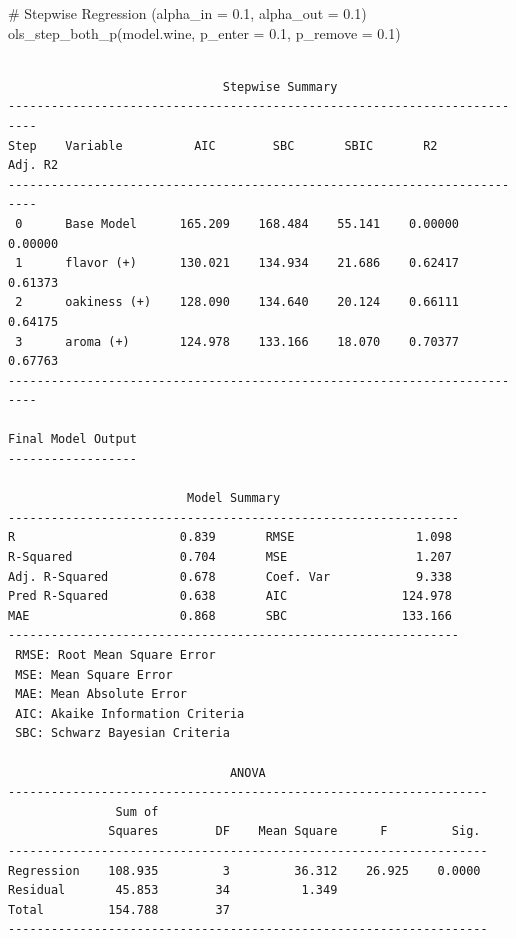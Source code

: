 \documentclass[
  letterpaper,
]{scrbook}
\newenvironment{Shaded}{\begin{snugshade}}{\end{snugshade}}
\newcommand{\AttributeTok}[1]{\textcolor[rgb]{0.40,0.45,0.13}{#1}}
\newcommand{\CommentTok}[1]{\textcolor[rgb]{0.37,0.37,0.37}{#1}}
\newcommand{\FloatTok}[1]{\textcolor[rgb]{0.68,0.00,0.00}{#1}}
\newcommand{\FunctionTok}[1]{\textcolor[rgb]{0.28,0.35,0.67}{#1}}
\newcommand{\NormalTok}[1]{\textcolor[rgb]{0.00,0.23,0.31}{#1}}
\begin{document}
\begin{Shaded}
\begin{Highlighting}[]
\CommentTok{\# Stepwise Regression (alpha\_in = 0.1, alpha\_out = 0.1)}
\FunctionTok{ols\_step\_both\_p}\NormalTok{(model.wine, }\AttributeTok{p\_enter =} \FloatTok{0.1}\NormalTok{, }\AttributeTok{p\_remove =} \FloatTok{0.1}\NormalTok{)}
\end{Highlighting}
\end{Shaded}

\begin{verbatim}

                              Stepwise Summary                              
--------------------------------------------------------------------------
Step    Variable          AIC        SBC       SBIC       R2       Adj. R2 
--------------------------------------------------------------------------
 0      Base Model      165.209    168.484    55.141    0.00000    0.00000 
 1      flavor (+)      130.021    134.934    21.686    0.62417    0.61373 
 2      oakiness (+)    128.090    134.640    20.124    0.66111    0.64175 
 3      aroma (+)       124.978    133.166    18.070    0.70377    0.67763 
--------------------------------------------------------------------------

Final Model Output 
------------------

                         Model Summary                          
---------------------------------------------------------------
R                       0.839       RMSE                 1.098 
R-Squared               0.704       MSE                  1.207 
Adj. R-Squared          0.678       Coef. Var            9.338 
Pred R-Squared          0.638       AIC                124.978 
MAE                     0.868       SBC                133.166 
---------------------------------------------------------------
 RMSE: Root Mean Square Error 
 MSE: Mean Square Error 
 MAE: Mean Absolute Error 
 AIC: Akaike Information Criteria 
 SBC: Schwarz Bayesian Criteria 

                               ANOVA                                
-------------------------------------------------------------------
               Sum of                                              
              Squares        DF    Mean Square      F         Sig. 
-------------------------------------------------------------------
Regression    108.935         3         36.312    26.925    0.0000 
Residual       45.853        34          1.349                     
Total         154.788        37                                    
-------------------------------------------------------------------


\end{verbatim}
\end{document}
